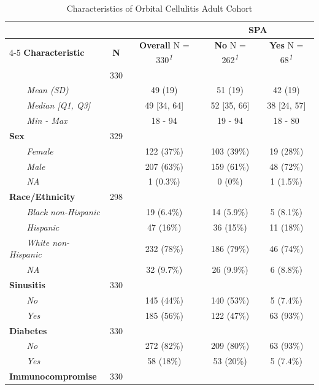\documentclass[
]{article}
\begin{document}
\begin{table}[t]
\caption*{
{\fontsize{20}{25}\selectfont  Characteristics of Orbital Cellulitis Adult Cohort\small }
} 
\begin{tabular*}{0.7\linewidth}{@{\extracolsep{\fill}}lcccc}
\toprule
 &  &  & \multicolumn{2}{c}{\textbf{SPA}} \\ 
\cmidrule(lr){4-5}
\textbf{Characteristic} & \textbf{N} & \textbf{Overall}  N = 330\textsuperscript{\textit{1}} & \textbf{No}  N = 262\textsuperscript{\textit{1}} & \textbf{Yes}  N = 68\textsuperscript{\textit{1}} \\ 
\midrule\addlinespace[2.5pt]
{\bfseries Age} & 330 &  &  &  \\ 
{\itshape     Mean (SD)} &  & 49 (19) & 51 (19) & 42 (19) \\ 
{\itshape     Median {[}Q1, Q3{]}} &  & 49 {[}34, 64{]} & 52 {[}35, 66{]} & 38 {[}24, 57{]} \\ 
{\itshape     Min - Max} &  & 18 - 94 & 19 - 94 & 18 - 80 \\ 
{\bfseries Sex} & 329 &  &  &  \\ 
{\itshape     Female} &  & 122 (37\%) & 103 (39\%) & 19 (28\%) \\ 
{\itshape     Male} &  & 207 (63\%) & 159 (61\%) & 48 (72\%) \\ 
{\itshape     NA} &  & 1 (0.3\%) & 0 (0\%) & 1 (1.5\%) \\ 
{\bfseries Race/Ethnicity} & 298 &  &  &  \\ 
{\itshape     Black non-Hispanic} &  & 19 (6.4\%) & 14 (5.9\%) & 5 (8.1\%) \\ 
{\itshape     Hispanic} &  & 47 (16\%) & 36 (15\%) & 11 (18\%) \\ 
{\itshape     White non-Hispanic} &  & 232 (78\%) & 186 (79\%) & 46 (74\%) \\ 
{\itshape     NA} &  & 32 (9.7\%) & 26 (9.9\%) & 6 (8.8\%) \\ 
{\bfseries Sinusitis} & 330 &  &  &  \\ 
{\itshape     No} &  & 145 (44\%) & 140 (53\%) & 5 (7.4\%) \\ 
{\itshape     Yes} &  & 185 (56\%) & 122 (47\%) & 63 (93\%) \\ 
{\bfseries Diabetes} & 330 &  &  &  \\ 
{\itshape     No} &  & 272 (82\%) & 209 (80\%) & 63 (93\%) \\ 
{\itshape     Yes} &  & 58 (18\%) & 53 (20\%) & 5 (7.4\%) \\ 
{\bfseries Immunocompromise} & 330 &  &  &  \\ 

\end{tabular*}
\end{table}
\end{document}
